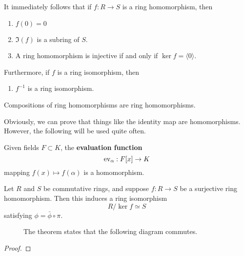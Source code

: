   \begin{lemma}
    It immediately follows that if $f: R \rightarrow S$ is a ring homomorphism, then 
    \begin{enumerate}
      \item $f(0) = 0$ 
      \item $\Im(f)$ is a subring of $S$. 
      \item A ring homomorphism is injective if and only if $\ker{f} = \langle 0 \rangle $.  
    \end{enumerate}
    Furthermore, if $f$ is a ring isomorphism, then 
    \begin{enumerate}
      \item $f^{-1}$ is a ring isomorphism. 
    \end{enumerate}
  \end{lemma}

  \begin{theorem}
    Compositions of ring homomorphisms are ring homomorphisms. 
  \end{theorem} 

  Obviously, we can prove that things like the identity map are homomorphisms. However, the following will be used quite often. 

  \begin{example}
    Given fields $F \subset K$, the \textbf{evaluation function} 
    \begin{equation}
      \ev_\alpha: F[x] \rightarrow K
    \end{equation}
    mapping $f(x) \mapsto f(\alpha)$ is a homomorphism. 
  \end{example}


  \begin{theorem}
    Let $R$ and $S$ be commutative rings, and suppose $f: R \rightarrow S$ be a surjective ring homomorphism. Then this induces a ring isomorphism
    \begin{equation}
      R /\ker{f} \simeq S
    \end{equation} 
    satisfying $\phi = \bar{\phi} \circ \pi$. 

    \begin{figure}[H]
      \centering 
      \caption{The theorem states that the following diagram commutes. } 
      \label{fig:fund_ring_homo_theorem}
    \end{figure}
  \end{theorem}
  \begin{proof}
    
  \end{proof} 


